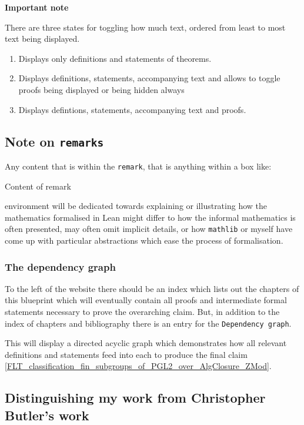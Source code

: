 \textbf{Important note}

There are three states for toggling how much text, ordered from least to most text being displayed.

\begin{enumerate}
    \item Displays only definitions and statements of theorems.
    \item Displays definitions, statements, accompanying text and allows to toggle proofs being displayed or being hidden always
    \item Displays defintions, statements, accompanying text and proofs.
\end{enumerate}

\subsection{Note on \texttt{remarks}}

Any content that is within the \texttt{remark}, that is anything within a box like:

\begin{remark}[A remark]
    Content of remark
\end{remark}
environment will be dedicated towards explaining or illustrating how the mathematics formalised in Lean might differ to 
how the informal mathematics is often presented, may often omit implicit details, or how \texttt{mathlib} or myself have come up with particular
abstractions which ease the process of formalisation.

\subsubsection{The dependency graph}

To the left of the website there should be an index which lists out the chapters of this blueprint which will eventually contain all proofs and intermediate formal statements necessary
to prove the overarching claim. But, in addition to the index of chapters and bibliography there is an entry for the \texttt{Dependency graph}.

This will display a directed acyclic graph which demonstrates how all relevant definitions and statements feed into each to produce the final claim \ref{FLT_classification_fin_subgroups_of_PGL2_over_AlgClosure_ZMod}.

\subsection{Distinguishing my work from Christopher Butler's work}


